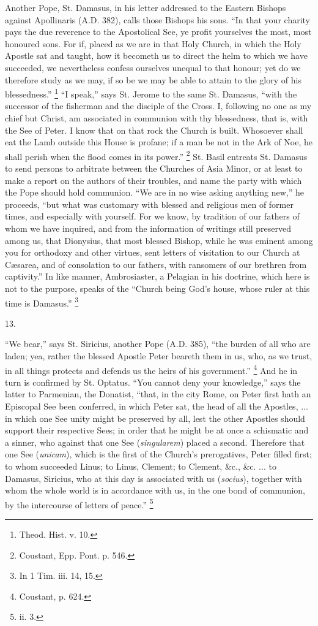 Another Pope, St. Damasus, in his letter addressed to
the Eastern Bishops against Apollinaris (A.D. 382), calls
those Bishops his sons. ``In that your charity pays
the due reverence to the Apostolical See, ye profit
yourselves the most, most honoured sons. For if, placed
as we are in that Holy Church, in which the Holy Apostle
sat and taught, how it becometh us to direct the helm to
which we have succeeded, we nevertheless confess
ourselves unequal to that honour; yet do we therefore
study as we may, if so be we may be able to attain to the
glory of his blessedness.'' \footnote{Theod. Hist. v. 10.} ``I speak,'' says
St. Jerome to the same St. Damasus, ``with the
successor of the fisherman and the disciple of the Cross.
I, following no one as my chief but Christ, am associated
in communion with thy blessedness, that is, with the See
of Peter. I know that on that rock the Church is built.
Whosoever shall eat the Lamb outside this House is
profane; if a man be not in the Ark of Noe, he shall
perish when the flood comes in its power.'' \footnote{Coustant, Epp. Pont. p. 546.} St.
Basil entreats St. Damasus to send persons to arbitrate
between the Churches of Asia Minor, or at least to make a
report on the authors of their troubles, and name the
party with which the Pope should hold communion. ``We
are in no wise asking anything new,'' he proceeds,
``but what was customary with blessed and religious
men of former times, and especially with yourself. For we
know, by tradition of our fathers of whom we have
inquired, and from the information of writings still
preserved among us, that Dionysius, that most blessed
Bishop, while he was eminent among you for orthodoxy and
other virtues, sent letters of visitation to our Church
at Cæsarea, and of consolation to our fathers, with
ransomers of our brethren from captivity.'' In like
manner, Ambrosiaster, a Pelagian in his doctrine, which
here is not to the purpose, speaks of the ``Church
being God's house, whose ruler at this time is
Damasus.'' \footnote{In 1 Tim. iii. 14, 15.}

13.

``We bear,'' says St. Siricius, another Pope (A.D. 385), ``the burden of all who are laden; yea,
rather the blessed Apostle Peter beareth them in us, who,
as we trust, in all things protects and defends us the
heirs of his government.'' \footnote{Coustant, p. 624.} And he in turn is confirmed
by St. Optatus. ``You cannot deny your
knowledge,'' says the latter to Parmenian, the
Donatist, ``that, in the city Rome, on Peter first
hath an Episcopal See been conferred, in which Peter sat,
the head of all the Apostles, ... in which one See unity
might be preserved by all, lest the other Apostles should
support their respective Sees; in order that he might be
at once a schismatic and a sinner, who against that one
See (\emph{singularem}) placed a second. Therefore that one See (\emph{unicam}), which is the first of the
Church's prerogatives, Peter filled first; to whom
succeeded Linus; to Linus, Clement; to Clement, \&c.,
\&c. ... to Damasus, Siricius, who at this day is
associated with us (\emph{socius}), together with whom
the whole world is in accordance with us, in the one bond
of communion, by the intercourse of letters of
peace.'' \footnote{ii. 3.}

